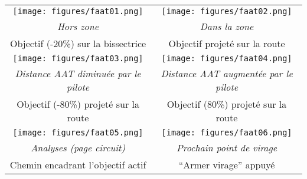 \begin{maxipage}
\begin{center}
\begin{longtable}{|c|c|}
\toprule
\texttt{[image: figures/faat01.png]} & 
\texttt{[image: figures/faat02.png]} \\
\emph{Hors zone} & \emph{Dans la zone} \\
Objectif (-20\%) sur la bissectrice & Objectif projeté sur la route \\

\midrule
\texttt{[image: figures/faat03.png]} & 
\texttt{[image: figures/faat04.png]} \\
\emph{Distance AAT diminuée par le pilote} & \emph{Distance AAT augmentée par le pilote} \\
Objectif (-80\%) projeté sur la route & Objectif (80\%) projeté sur la route \\

\midrule
\texttt{[image: figures/faat05.png]} & 
\texttt{[image: figures/faat06.png]} \\
\emph{Analyses (page circuit)} & \emph{Prochain point de virage} \\
Chemin encadrant l'objectif actif & ``Armer virage'' appuyé \\
\bottomrule
\end{longtable}
\end{center}
\end{maxipage}

